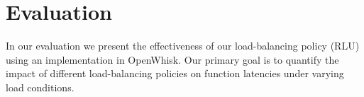 \section{Evaluation}
\label{sec:chrlu-eval}
In our evaluation we present the effectiveness of our load-balancing policy (RLU) using an implementation in OpenWhisk. 
Our primary goal is to quantify the impact of different load-balancing policies on function latencies under varying load conditions. 



% 
